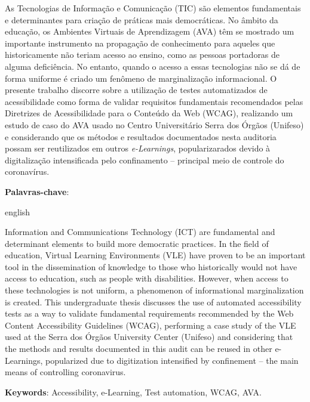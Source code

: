 \documentclass[
	12pt,				%
	openright,			%
	oneside,			%
	a4paper,			%
	chapter=TITLE,		%
	section=TITLE,		%
	subsection=TITLE,	%
	subsubsection=TITLE,%
	english,			%
	brazil				%
	]{abntex2}
\theoremstyle{definition}
\begin{document}
\setlength{\absparsep}{18pt} %
\begin{resumo}

As Tecnologias de Informação e Comunicação (TIC) são elementos fundamentais e determinantes para criação de práticas mais democráticas. No âmbito da educação, os Ambientes Virtuais de Aprendizagem (AVA) têm se mostrado um importante instrumento na propagação de conhecimento para aqueles que historicamente não teriam acesso ao ensino, como as pessoas portadoras de alguma deficiência. No entanto, quando o acesso a essas tecnologias não se dá de forma uniforme é criado um fenômeno de marginalização informacional. O presente trabalho discorre sobre a utilização de testes automatizados de acessibilidade como forma de validar requisitos fundamentais recomendados pelas Diretrizes de Acessibilidade para o Conteúdo da Web (WCAG), realizando um estudo de caso do AVA usado no Centro Universitário Serra dos Órgãos (Unifeso) e considerando que os métodos e resultados documentados nesta auditoria possam ser reutilizados em outros \textit{e-Learnings}, popularizarados devido à digitalização intensificada pelo confinamento – principal meio de controle do coronavírus.

 \textbf{Palavras-chave}: \imprimirpalavraschave
\end{resumo}

\begin{resumo}[Abstract]
 \begin{otherlanguage*}{english}
  
Information and Communications Technology (ICT) are fundamental and determinant elements to build more democratic practices. In the field of education, Virtual Learning Environments (VLE) have proven to be an important tool in the dissemination of knowledge to those who historically would not have access to education, such as people with disabilities. However, when access to these technologies is not uniform, a phenomenon of informational marginalization is created. This undergraduate thesis discusses the use of automated accessibility tests as a way to validate fundamental requirements recommended by the Web Content Accessibility Guidelines (WCAG), performing a case study of the VLE used at the Serra dos Órgãos University Center (Unifeso) and considering that the methods and results documented in this audit can be reused in other e-Learnings, popularized due to digitization intensified by confinement – the main means of controlling coronavirus.

   \vspace{\onelineskip}
 
   \noindent 
   \textbf{Keywords}: Accessibility, e-Learning, Test automation, WCAG, AVA.
 \end{otherlanguage*}
\end{resumo}
\end{document}
